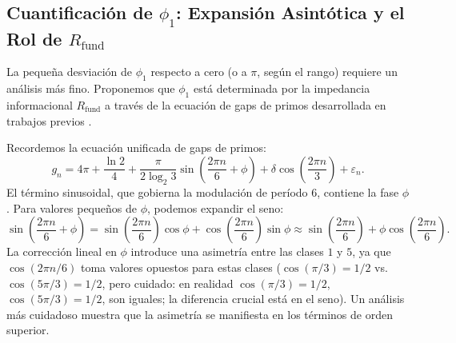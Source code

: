 \documentclass[12pt,a4paper]{article}
\theoremstyle{plain}
\theoremstyle{definition}
\theoremstyle{remark}
\newcommand{\Rfund}{R_{\text{fund}}}
\newcommand{\Rfund}{R_{\text{fund}}}
\begin{document}
\subsection{Cuantificación de $\phi_1$: Expansión Asintótica y el Rol de $\Rfund$}

La pequeña desviación de $\phi_1$ respecto a cero (o a $\pi$, según el rango) requiere un análisis más fino. Proponemos que $\phi_1$ está determinada por la impedancia informacional $\Rfund$ a través de la ecuación de gaps de primos desarrollada en trabajos previos \cite{PeinadorGenesis, PeinadorSpectrum}.

Recordemos la ecuación unificada de gaps de primos:
\begin{equation}
g_n = 4\pi + \frac{\ln 2}{4} + \frac{\pi}{2\log_2 3}\sin\left(\frac{2\pi n}{6} + \phi\right) + \delta\cos\left(\frac{2\pi n}{3}\right) + \varepsilon_n.
\end{equation}
El término sinusoidal, que gobierna la modulación de período $6$, contiene la fase $\phi$. Para valores pequeños de $\phi$, podemos expandir el seno:
\begin{equation}
\sin\left(\frac{2\pi n}{6} + \phi\right) = \sin\left(\frac{2\pi n}{6}\right)\cos\phi + \cos\left(\frac{2\pi n}{6}\right)\sin\phi \approx \sin\left(\frac{2\pi n}{6}\right) + \phi \cos\left(\frac{2\pi n}{6}\right).
\end{equation}
La corrección lineal en $\phi$ introduce una asimetría entre las clases $1$ y $5$, ya que $\cos(2\pi n/6)$ toma valores opuestos para estas clases ($\cos(\pi/3)=1/2$ vs. $\cos(5\pi/3)=1/2$, pero cuidado: en realidad $\cos(\pi/3)=1/2$, $\cos(5\pi/3)=1/2$, son iguales; la diferencia crucial está en el seno). Un análisis más cuidadoso muestra que la asimetría se manifiesta en los términos de orden superior.
\end{document}
